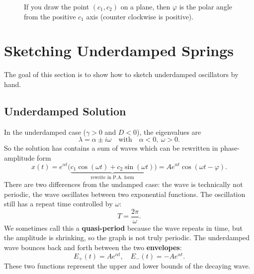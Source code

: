 \documentclass[10pt,letterpaper]{article}
\begin{document}
\begin{figure}[H]
\begin{center}
    \centering
{}
\end{center}
    \caption{If you draw the point $(c_1,c_2)$ on a plane, then $\varphi$ is the polar angle from the positive $c_1$ axis (counter clockwise is positive).}
\end{figure}

\section{Sketching Underdamped Springs}
The goal of this section is to show how to sketch underdamped oscillators by hand. 

\subsection{Underdamped Solution}
In the underdamped case ($\gamma>0$ and $D<0$), the eigenvalues are
\[
\lambda=\alpha\pm i\omega
\quad\text{with}\quad \alpha<0,\ \omega>0.
\]
So the solution has contains a sum of waves which can be rewritten in phase-amplitude form 
\[
x(t)=e^{\alpha t}\bigl(\underbrace{c_1\cos(\omega t)+c_2\sin(\omega t)}_{\text{rewrite in P.A. form}}\bigr) =A e^{\alpha t}\cos(\omega t-\varphi).
\]
There are two differences from the undamped case: the wave is technically not periodic, the wave oscillates between two exponential functions. The oscillation still has a repeat time controlled by $\omega$:
\[
T=\frac{2\pi}{\omega}.
\]
We sometimes call this a \textbf{quasi-period} because the wave repeats in time, but the amplitude is shrinking, so the graph is not truly periodic. The underdamped wave bounces back and forth between the two \textbf{envelopes}:
$$
E_+(t) = Ae^{\alpha t},\quad E_-(t)=-Ae^{\alpha t}.
$$
These two functions represent the upper and lower bounds of the decaying wave.
\end{document}

